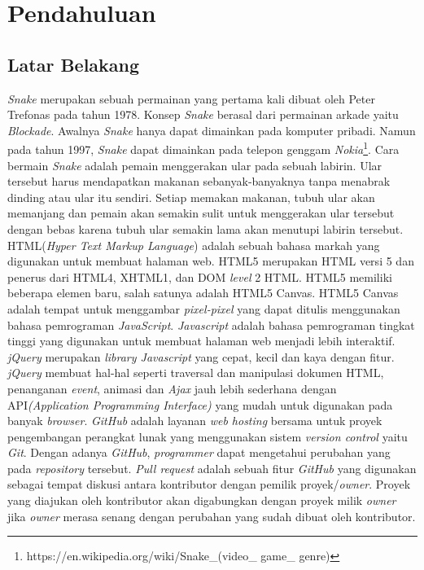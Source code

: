 \chapter{Pendahuluan}
\label{chap:intro}
   
\section{Latar Belakang}
\label{sec:label}

\textit{Snake} merupakan sebuah permainan yang pertama kali dibuat oleh Peter Trefonas pada tahun 1978. Konsep \textit{Snake} berasal dari permainan arkade yaitu \textit{Blockade}. Awalnya \textit{Snake} hanya dapat dimainkan pada komputer pribadi. Namun pada tahun 1997, \textit{Snake} dapat dimainkan pada telepon genggam \textit{Nokia}\footnote{https://en.wikipedia.org/wiki/Snake\_(video\_ game\_ genre)}. Cara bermain \textit{Snake} adalah pemain menggerakan ular pada sebuah labirin. Ular tersebut harus mendapatkan makanan sebanyak-banyaknya tanpa menabrak dinding atau ular itu sendiri. Setiap memakan makanan, tubuh ular akan memanjang dan pemain akan semakin sulit untuk menggerakan ular tersebut dengan bebas karena tubuh ular semakin lama akan menutupi labirin tersebut. \\

HTML(\textit{Hyper Text Markup Language}) adalah sebuah bahasa markah yang digunakan untuk membuat halaman web. HTML5 merupakan HTML versi 5 dan penerus dari HTML4, XHTML1, dan DOM \textit{level} 2 HTML. HTML5 memiliki beberapa elemen baru, salah satunya adalah HTML5 Canvas. HTML5 Canvas adalah tempat untuk menggambar \textit{pixel-pixel} yang dapat ditulis menggunakan bahasa pemrograman \textit{JavaScript}. \textit{Javascript} adalah bahasa pemrograman tingkat tinggi yang digunakan untuk membuat halaman web menjadi lebih interaktif. \textit{jQuery} merupakan \textit{library Javascript} yang cepat, kecil dan kaya dengan fitur. \textit{jQuery} membuat hal-hal seperti traversal dan manipulasi dokumen HTML, penanganan \textit{event}, animasi dan \textit{Ajax} jauh lebih sederhana dengan API\textit{(Application Programming Interface)} yang mudah untuk digunakan pada banyak \textit{browser}. \textit{GitHub} adalah layanan \textit{web hosting} bersama untuk proyek pengembangan perangkat lunak yang menggunakan sistem \textit{version control} yaitu \textit{Git}. Dengan adanya \textit{GitHub}, \textit{programmer} dapat mengetahui perubahan yang pada \textit{repository} tersebut. \textit{Pull request} adalah sebuah fitur \textit{GitHub} yang digunakan sebagai tempat diskusi antara kontributor dengan pemilik proyek/\textit{owner}. Proyek yang diajukan oleh kontributor akan digabungkan dengan proyek milik \textit{owner} jika \textit{owner} merasa senang dengan perubahan yang sudah dibuat oleh kontributor. \\

